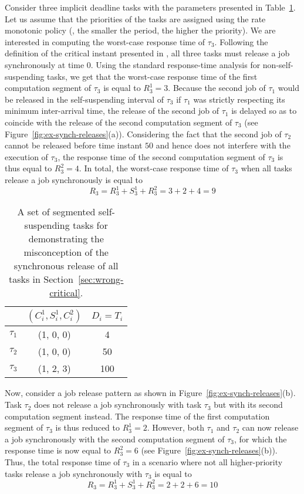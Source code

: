 Consider three implicit deadline tasks with the parameters presented in Table~\ref{table:ex-synch-releases}. Let us assume that the priorities of the tasks are assigned using the rate monotonic policy (\ie, the smaller the period, the higher the priority). We are interested in computing the worst-case response time of $\tau_3$. Following the definition of the critical instant presented in \cite{LR:rtas10}, all three tasks must release a job synchronously at time $0$. Using the standard response-time analysis for non-self-suspending tasks, we get that the worst-case response time of the first computation segment of $\tau_3$ is equal to $R_3^1 = 3$. Because the second job of $\tau_1$ would be released in the self-suspending interval of $\tau_3$ if $\tau_1$ was strictly respecting its minimum inter-arrival time, the release of the second job of $\tau_1$ is delayed so as to coincide with the release of the second computation segment of $\tau_3$ (see Figure~\ref{fig:ex-synch-releases}(a)). Considering the fact that the second job of $\tau_2$ cannot be released before time instant $50$ and hence does not interfere with the execution of $\tau_3$, the response time of the second computation segment of $\tau_3$ is thus equal to $R_3^2=4$. In total, the worst-case response time of $\tau_3$ when all tasks release a job synchronously is equal to 
$$R_3 = R_3^1 + S_3^1 + R_3^2 = 3 + 2 +4 = 9$$

\begin{table}[t] 
\centering
    \begin{tabular}{|c|c|c|}
 \hline
        & $(C_i^1, S_i^1, C_i^2)$ &  $D_i=T_i$\\ 
        \hline
        $\tau_1$ & (1, 0, 0) &  4\\ 
        $\tau_2$ &  (1, 0, 0) & 50  \\ 
        $\tau_3$ & (1, 2, 3) & 100  \\
        \hline
    \end{tabular} 
    \caption{A set of segmented self-suspending tasks for demonstrating the misconception
of the synchronous release of all tasks in Section~\ref{sec:wrong-critical}.}
    \label{table:ex-synch-releases}
\end{table}

Now, consider a job release pattern as shown in Figure~\ref{fig:ex-synch-releases}(b). Task $\tau_2$ does not release a job synchronously with task $\tau_3$ but with its second computation segment instead. The response time of the first computation segment of $\tau_3$ is thus reduced to $R_3^1=2$. However, both $\tau_1$ and $\tau_2$ can now release a job synchronously with the second computation segment of $\tau_3$, for which the response time is now equal to $R_3^2=6$ (see Figure~\ref{fig:ex-synch-releases}(b)). Thus, the total response time of $\tau_3$ in a scenario where not all higher-priority tasks release a job synchronously with $\tau_3$ is equal to 
$$R_3 = R_3^1 + S_3^1 + R_3^2 = 2+2+6 = 10$$

